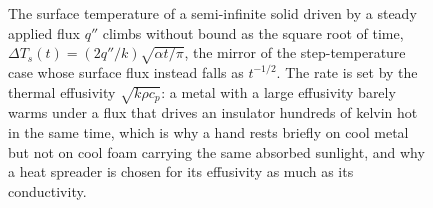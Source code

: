 \begin{figure}[htbp]
\centering
{}
\caption[Surface temperature under a constant applied flux]{The surface
temperature of a semi-infinite solid driven by a steady applied flux
$q''$ climbs without bound as the square root of time,
$\Delta T_s(t) = (2 q''/k)\sqrt{\alpha t/\pi}$, the mirror of the
step-temperature case whose surface flux instead falls as
$t^{-1/2}$. The rate is set by the thermal effusivity
$\sqrt{k\rho c_p}$: a metal with a large effusivity barely warms under a
flux that drives an insulator hundreds of kelvin hot in the same time,
which is why a hand rests briefly on cool metal but not on cool foam
carrying the same absorbed sunlight, and why a heat spreader is chosen
for its effusivity as much as its conductivity.}
\label{fig:vol04ch05:constant-flux-surface}
\end{figure}
